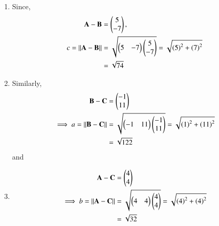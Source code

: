 \begin{enumerate}
	\item Since,
\begin{align}
\vec{A}-\vec{B} &= \myvec{5\\-7}, \\
c = 	\norm{\vec{A}-\vec{B}} &= \sqrt{\myvec{5 & -7}\myvec{5\\-7}}
= \sqrt{\brak{5}^2 +\brak{7}^2}\\
	&=\sqrt{74}
		\label{eq:geo-norm-ab}
\end{align}
	\item Similarly, 
\begin{align}
\vec{B}-\vec{C} &= \myvec{-1\\11}\\
\implies 
a = \norm{\vec{B}-\vec{C}} &= \sqrt{\myvec{-1 & 11}\myvec{-1\\11}}
= \sqrt{\brak{1}^2+\brak{11}^2}
\\
	&= \sqrt{122}
		\label{eq:geo-norm-bc}
\end{align}
and
	\item \begin{align}
\vec{A}-\vec{C} &= \myvec{4\\4}\\
\implies
b = \norm{\vec{A}-\vec{C}} &= \sqrt{\myvec{4 & 4}\myvec{4\\4}}
= \sqrt{\brak{4}^2+\brak{4}^2}
\\
	&=\sqrt{32}
		\label{eq:geo-norm-ca}
\end{align}
\end{enumerate}
